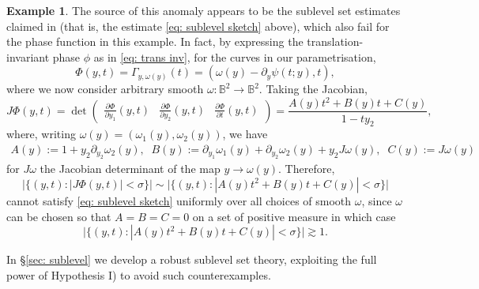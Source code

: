 \documentclass[reqno]{amsart}
\numberwithin{equation}{section}
\newcommand{\B}{\mathbb{B}}
\theoremstyle{plain}
\theoremstyle{definition}
\newtheorem{example}[theorem]{Example}
\begin{document}
\begin{example}
The source of this anomaly appears to be the sublevel set estimates claimed in \cite[pp.364-365]{Bourgain1991} (that is, the estimate \eqref{eq: sublevel sketch} above), which also fail for the phase function in this example. In fact, by expressing the translation-invariant phase $\phi$ as in \eqref{eq: trans inv}, for the curves in our parametrisation,
\begin{equation*}
  \Phi(y, t) = \Gamma_{y,\omega(y)} (t) = (\omega(y) - \partial_y\psi(t;y), t),  
\end{equation*}
where we now consider arbitrary smooth $\omega \colon \B^2 \to \B^2$. Taking the Jacobian,
\begin{equation*}
    J\Phi(y,t) = \det
    \begin{pmatrix}
    \frac{\partial \Phi}{\partial y_1}(y,t) & \frac{\partial \Phi}{\partial y_2}(y,t) & \frac{\partial \Phi}{\partial t}(y,t)
    \end{pmatrix}
    = \frac{A(y) t^2 + B(y) t + C(y)}{1 - ty_2},
\end{equation*}
where, writing $\omega(y) = (\omega_1(y), \omega_2(y))$, we have
\begin{gather*}
  A(y) := 1 + y_2\partial_{y_2}\omega_2(y), \;\; B(y) := \partial_{y_1}\omega_1(y) + \partial_{y_2}\omega_2(y) + y_2 J\omega(y), \;\;
  C(y) := J\omega(y)
\end{gather*}
for $J\omega$ the Jacobian determinant of the map $y \to \omega(y)$. Therefore, 
\begin{equation*}
    \bigl|\{(y,t) : |J\Phi(y,t)| < \sigma \}\bigr| \sim \bigl|\{(y,t): |A(y) t^2 + B(y) t + C(y)| < \sigma \}\bigr|
\end{equation*}
cannot satisfy \eqref{eq: sublevel sketch} uniformly over all choices of smooth $\omega$, since $\omega$ can be chosen so that $A = B = C = 0$ on a set of positive measure in which case
\begin{equation*}
\bigl|\{(y,t): |A(y) t^2 + B(y) t + C(y)| < \sigma \}\bigr| \gtrsim 1.
\end{equation*}

\end{example}



In \S\ref{sec: sublevel} we develop a robust sublevel set theory, exploiting the full power of Hypothesis I) to avoid such counterexamples. 



\end{document}
